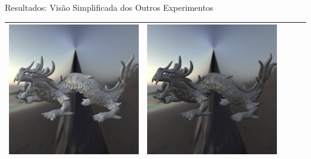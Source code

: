 \begin{frame}[fragile]{Resultados: Visão Simplificada dos Outros Experimentos}
\begin{table}
\begin{tabular}{|c|c|c|c|c|}
           \includegraphics[scale=0.14]{./Imagens/brdfs/ward-dragon.png} & 
           \includegraphics[scale=0.14]{./Imagens/brdfs/ashikhmin-shirley-close-to-original-dragon.png} \\ \hline
       \end{tabular}
   \end{table}


\end{frame}

